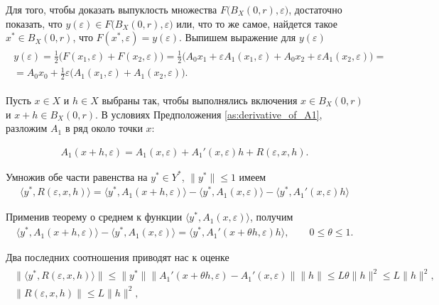\documentclass[../main.tex]{subfiles}
\begin{document}
Для того, чтобы доказать выпуклость множества $F\big(B_X(0,r),\varepsilon\big)$, достаточно показать, что $y(\varepsilon) \in F\big(B_X(0,r),\varepsilon\big)$ или, что то же самое, найдется такое $x^* \in B_X(0,r) $, что $F(x^*, \varepsilon) = y(\varepsilon) $.
Выпишем выражение для $y(\varepsilon)$
\begin{gather}\label{y}
    \begin{gathered}
        y(\varepsilon)=
        \frac{1}{2} \big(
        F(x_1,\varepsilon)+ 
        F(x_2,\varepsilon)
        \big) = 
        \frac{1}{2} \big(
        A_0 x_1 +
        \varepsilon A_1(x_1,\varepsilon) +
        A_0 x_2 +
        \varepsilon A_1(x_2,\varepsilon) 
        \big) = \\ = A_0 x_0 + 
        \frac{1}{2} \varepsilon \big( 
        A_1(x_1,\varepsilon)+ 
        A_1(x_2,\varepsilon)
        \big).
    \end{gathered}
\end{gather}

Пусть $x \in X$ и $h \in X$ выбраны так, чтобы выполнялись включения $x\in B_X(0, r)$ и $x+h \in B_X(0, r)$.
В условиях Предположения \ref{as:derivative_of_A1}, разложим $A_1$ в ряд около точки $x$:

\begin{gather}\label{A1_series}
    A_1(x + h,\varepsilon) = A_1(x,\varepsilon) + A_1'(x,\varepsilon) h + R(\varepsilon, x, h).
\end{gather}

Умножив обе части равенства на $y^* \in Y^*$, $\|y^*\| \leqslant 1$ имеем
\begin{gather*}
    \langle y^*, R(\varepsilon, x, h) \rangle = 
    \langle y^*, A_1(x + h,\varepsilon) \rangle -
    \langle y^*, A_1(x,\varepsilon) \rangle -
    \langle y^*, A_1'(x,\varepsilon) h \rangle
\end{gather*}

Применив теорему о среднем к функции $\langle y^*, A_1(x,\varepsilon) \rangle$, получим
\begin{gather*}
    \langle y^*, A_1(x + h,\varepsilon) \rangle -
    \langle y^*, A_1(x,\varepsilon) \rangle = 
    \langle y^*, A_1'(x + \theta h,\varepsilon) h \rangle,
    \qquad
    0 \leqslant \theta \leqslant 1.
\end{gather*}

Два последних соотношения приводят нас к оценке
\begin{gather}
    \begin{gathered}
        \|\langle y^*, R(\varepsilon, x, h) \rangle \| \leqslant
        \| y^* \| 
        \| A_1'(x + \theta h,\varepsilon)  -
        A_1'(x,\varepsilon) \| 
        \| h  \| \leqslant 
        L \theta \|h\|^2 \leqslant
        L \|h\|^2, \\
        \| R(\varepsilon, x, h) \| \leqslant
        L \|h\|^2, 
    \end{gathered}
\end{gather}
\end{document}
